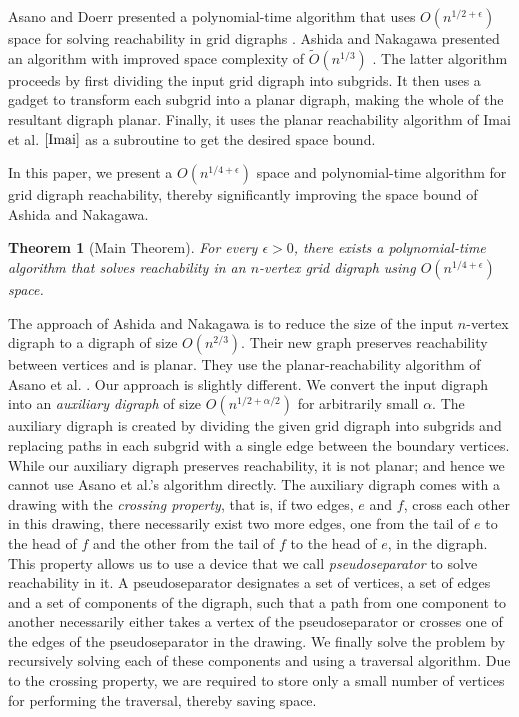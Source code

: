 \documentclass[11pt]{article}
\numberwithin{equation}{section}
\newtheorem{theorem}{Theorem}[section]
\theoremstyle{definition}
\theoremstyle{plain}
\begin{document}
%
Asano and Doerr presented a polynomial-time algorithm that uses $O(n^{1/2 + \epsilon})$ space for solving reachability in grid 
%
%
%
digraphs  \cite{Asano11}.  %
Ashida and Nakagawa presented an algorithm with improved space complexity of $\widetilde{O}(n^{1/3})$ \cite{AshidaNakagawa}.
%
%
The latter algorithm %
proceeds  %
by first dividing the input grid 
digraph %
into subgrids. It then
%
uses  %
a gadget to transform each subgrid into a planar 
digraph, %
making the whole of the resultant 
digraph %
planar. Finally, it
%
uses  %
the planar reachability algorithm of Imai et al. $\cite{Imai}$ as a subroutine to get the desired space bound.
%

In this paper, we present a $O(n^{1/4 + \epsilon})$ space and polynomial-time algorithm for grid 
digraph %
reachability, thereby significantly improving the
%
space bound  %
of Ashida and Nakagawa.

\begin{theorem}[Main Theorem]
\label{thm:main}
For every $\epsilon > 0$, there exists a polynomial-time algorithm that
%
solves  %
reachability in an %
$n$-vertex   %
grid 
digraph %
using $O(n^{1/4 + \epsilon})$ space.
\end{theorem}


The approach of Ashida and Nakagawa \cite{AshidaNakagawa}
%
%
is   %
to reduce the size of the input $n$-vertex 
digraph %
to a 
digraph %
of size $O(n^{2/3})$. Their new graph %
preserves  %
reachability between vertices and %
is planar.  %
%
They use  %
the planar-reachability algorithm of Asano et al. \cite{Asano}.
%
Our approach is slightly different. We convert the input 
digraph %
into an 
%
\emph{auxiliary digraph} %
 of size $O(n^{1/2 + \alpha/2})$ for arbitrarily small $\alpha$. The auxiliary 
digraph %
is created by dividing the given grid 
digraph %
into subgrids and replacing paths in each subgrid with a single edge between the boundary vertices.  While our auxiliary 
digraph %
preserves reachability, it is not planar; and hence we cannot use Asano et al.'s algorithm directly. The auxiliary 
digraph %
comes with a drawing with
the  %
\emph{crossing property}, that is, if two edges, $e$ and $f$,
%
cross each other in this drawing, there necessarily exist two more edges, one from the tail of $e$ to the head of $f$ and the other from the tail of $f$ to the head of $e$, in the 
digraph. %
This property allows us to use a device that we call \emph{pseudoseparator} to solve reachability in it. A pseudoseparator designates a set of vertices, a set of edges and a set of components of the 
digraph, %
such that a path from one component to %
another   %
necessarily either takes a vertex of the pseudoseparator or crosses one of the edges of the pseudoseparator in the drawing.
We finally solve the problem by recursively solving each of these components and using a traversal algorithm. Due to the crossing property, we are required to store only a small number of vertices for performing the traversal, thereby saving space.
\end{document}
